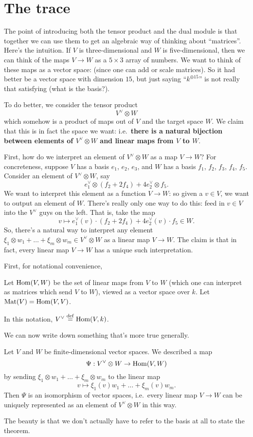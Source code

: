 \section{The trace}
The point of introducing both the tensor product and the dual module is that together
we can use them to get an algebraic way of thinking about ``matrices''.
Here's the intuition.
If $V$ is three-dimensional and $W$ is five-dimensional, then we can think
of the maps $V \to W$ as a $5 \times 3$ array of numbers.
We want to think of these maps as a vector space:
(since one can add or scale matrices).
So it had better be a vector space with dimension $15$,
but just saying ``$k^{\oplus 15}$'' is not really that satisfying
(what is the basis?).

To do better, we consider the tensor product \[ V^\vee \otimes W \]
which somehow is a product of maps out of $V$ and the target space $W$.
We claim that this is in fact the space we want:
i.e.\ \textbf{there is a natural bijection between elements of $V^\vee \otimes W$
and linear maps from $V$ to $W$}.

First, how do we interpret an element of $V^\vee \otimes W$ as a map $V \to W$?
For concreteness, suppose $V$ has a basis $e_1$, $e_2$, $e_3$,
and $W$ has a basis $f_1$, $f_2$, $f_3$, $f_4$, $f_5$.
Consider an element of $V^\vee \otimes W$, say
\[ e_1^\vee \otimes (f_2 + 2f_4) + 4e_2^\vee \otimes f_5. \]
We want to interpret this element as a function $V \to W$:
so given a $v \in V$,
we want to output an element of $W$.
There's really only one way to do this:
feed in $v \in V$ into the $V^\vee$ guys on the left.
That is, take the map
\[ v \mapsto e_1^\vee(v) \cdot (f_2 + 2f_4) + 4e_2^\vee(v) \cdot f_5 \in W. \]
So, there's a natural way to interpret any element
$\xi_1 \otimes w_1 + \dots + \xi_m \otimes w_m \in V^\vee \otimes W$
as a linear map $V \to W$.
The claim is that in fact, every linear map $V \to W$ has a unique such interpretation.

First, for notational convenience,
\begin{definition}
	Let $\operatorname{Hom}(V,W)$ be the set of linear maps from $V$ to $W$
	(which one can interpret as matrices which send $V$ to $W$),
	viewed as a vector space over $k$.
	Let $\mathrm{Mat}(V) = \operatorname{Hom}(V,V)$.
\end{definition}
In this notation, $V^\vee \overset{\mathrm{def}}{=} \operatorname{Hom}(V,k)$.

We can now write down something that's more true generally.
\begin{theorem}
	Let $V$ and $W$ be finite-dimensional vector spaces.
	We described a map
	\[ \Psi : V^\vee \otimes W \to \operatorname{Hom}(V,W) \]
	by sending $\xi_1 \otimes w_1 + \dots + \xi_m \otimes w_m$ to the linear map
	\[ v \mapsto \xi_1(v) w_1 + \dots + \xi_m(v) w_m. \]
	Then $\Psi$ is an isomorphism of vector spaces, i.e.\ every linear map $V \to W$
	can be uniquely represented as an element of $V^\vee \otimes W$ in this way.
\end{theorem}
The beauty is that we don't actually have to refer to the basis at all to state the theorem.

